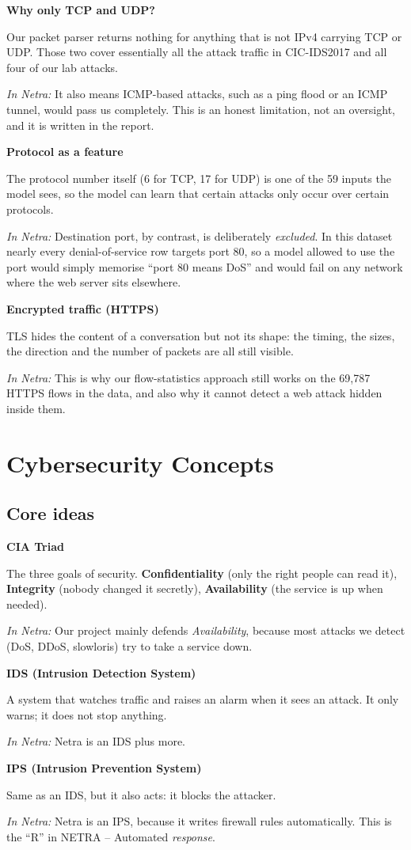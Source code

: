 \documentclass[11pt,a4paper]{article}
\newcommand{\term}[3]{%
  \par\medskip\noindent\textbf{\color{ink}#1}\par
  \nobreak\vspace{1pt}#2\par
  \nobreak\vspace{1pt}\textit{\color{accent}In Netra:} #3\par}
\begin{document}
\term{Why only TCP and UDP?}
{Our packet parser returns nothing for anything that is not IPv4 carrying TCP or
UDP. Those two cover essentially all the attack traffic in CIC-IDS2017 and all
four of our lab attacks.}
{It also means ICMP-based attacks, such as a ping flood or an ICMP tunnel, would
pass us completely. This is an honest limitation, not an oversight, and it is
written in the report.}

\term{Protocol as a feature}
{The protocol number itself (6 for TCP, 17 for UDP) is one of the 59 inputs the
model sees, so the model can learn that certain attacks only occur over certain
protocols.}
{Destination port, by contrast, is deliberately \emph{excluded}. In this dataset
nearly every denial-of-service row targets port 80, so a model allowed to use
the port would simply memorise ``port 80 means DoS'' and would fail on any
network where the web server sits elsewhere.}

\term{Encrypted traffic (HTTPS)}
{TLS hides the content of a conversation but not its shape: the timing, the
sizes, the direction and the number of packets are all still visible.}
{This is why our flow-statistics approach still works on the 69,787 HTTPS flows
in the data, and also why it cannot detect a web attack hidden inside them.}

\section{Cybersecurity Concepts}

\subsection{Core ideas}

\term{CIA Triad}
{The three goals of security. \textbf{Confidentiality} (only the right people can
read it), \textbf{Integrity} (nobody changed it secretly),
\textbf{Availability} (the service is up when needed).}
{Our project mainly defends \emph{Availability}, because most attacks we detect
(DoS, DDoS, slowloris) try to take a service down.}

\term{IDS (Intrusion Detection System)}
{A system that watches traffic and raises an alarm when it sees an attack. It only
warns; it does not stop anything.}
{Netra is an IDS plus more.}

\term{IPS (Intrusion Prevention System)}
{Same as an IDS, but it also acts: it blocks the attacker.}
{Netra is an IPS, because it writes firewall rules automatically. This is the ``R''
in NETRA -- Automated \emph{response}.}
\end{document}
